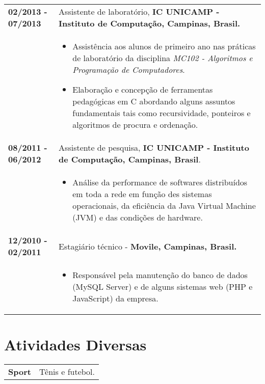 \documentclass[10pt, a4paper]{article}
\begin{document}
\begin{tabular}{p{} p{}}

\textbf{02/2013 - 07/2013}   & Assistente de laboratório, \textbf{IC
UNICAMP - Instituto de Computação, Campinas, Brasil.} \\
& \vspace{-12pt}
\begin{itemize}
  \item Assistência aos alunos de primeiro ano nas práticas de laboratório da
  disciplina \textit{MC102 - Algoritmos e Programação de Computadores}.
  \vspace{-8pt}
  \item Elaboração e concepção de ferramentas pedagógicas em C
  abordando alguns assuntos fundamentais tais como recursividade, ponteiros e
  algoritmos de procura e ordenação.
\end{itemize}\\

\textbf{08/2011 - 06/2012} & Assistente de pesquisa, \textbf{IC UNICAMP -
Instituto de Computação, Campinas, Brasil}. \\
& \vspace{-12pt}
\begin{itemize}
  \item Análise da performance de softwares distribuídos em toda a rede em
  função des sistemas operacionais, da eficiência da Java Virtual Machine (JVM)
  e das condições de hardware.
\end{itemize}
\\


\textbf{12/2010 - 02/2011} & Estagiário técnico - \textbf{Movile,
Campinas, Brasil.}
\\  &  \vspace{-12pt}
\begin{itemize} 
\item Responsável pela manutenção do banco de dados (MySQL Server) e de
alguns sistemas web (PHP e JavaScript) da empresa.
\end{itemize}
\end{tabular}
\vspace{-12pt}


\section{Atividades Diversas}

\begin{tabular}{p{} p{}}

\textbf{Sport} & Tênis e futebol. \\

\end{tabular}

\end{document}
